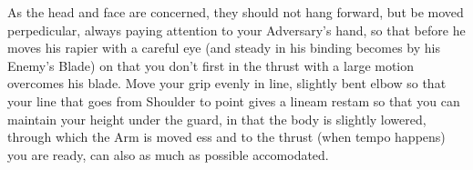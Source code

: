 As the head and face are concerned, they should not hang forward, but
be moved perpedicular, always paying attention to your Adversary's
hand, so that before he moves his rapier with a careful eye (and
steady in his binding becomes by his Enemy's Blade) on that you
don't first in the thrust with a large motion overcomes his
blade. Move your grip evenly in line, slightly bent elbow so that your
line that goes from Shoulder to point gives a lineam restam so that
you can maintain your height under the guard, in that the body is
slightly lowered, through which the Arm is moved ess and to the thrust
(when tempo happens) you are ready, can also as much as possible accomodated.